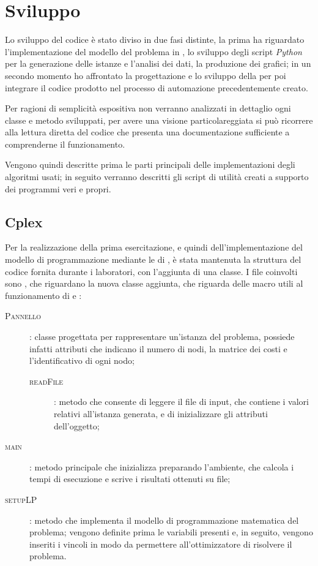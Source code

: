 \section{Sviluppo}
Lo sviluppo del codice è stato diviso in due fasi distinte, la prima ha riguardato l'implementazione del modello del problema in , lo sviluppo degli script \emph{Python} per la generazione delle istanze e l'analisi dei dati, la produzione dei grafici; in un secondo momento ho affrontato la progettazione e lo sviluppo della \tabu per poi integrare il codice prodotto nel processo di automazione precedentemente creato.

Per ragioni di semplicità espositiva non verranno analizzati in dettaglio ogni classe e metodo sviluppati, per avere una visione particolareggiata si può ricorrere alla lettura diretta del codice che presenta una documentazione sufficiente a comprenderne il funzionamento.

Vengono quindi descritte prima le parti principali delle implementazioni degli algoritmi usati; in seguito verranno descritti gli script di utilità creati a supporto dei programmi veri e propri.

\subsection{Cplex}
Per la realizzazione della prima esercitazione, e quindi dell'implementazione del modello di programmazione mediante le  di , è stata mantenuta la struttura del codice fornita durante i laboratori, con l'aggiunta di una classe.
I file coinvolti sono ,  che riguardano la nuova classe aggiunta,  che riguarda delle macro utili al funzionamento di  e :

\begin{description}
	\item[\textsc{Pannello}]: classe progettata per rappresentare un'istanza del problema, possiede infatti attributi che indicano il numero di nodi, la matrice dei costi e l'identificativo di ogni nodo;
	\begin{description}
		\item[\textsc{readFile}]: metodo che consente di leggere il file di input, che contiene i valori relativi all'istanza generata, e di inizializzare gli attributi dell'oggetto;
	\end{description}
	\item[\textsc{main}]: metodo principale che inizializza  preparando l'ambiente, che calcola i tempi di esecuzione e scrive i risultati ottenuti su file;
	\item[\textsc{setupLP}]: metodo che implementa il modello di programmazione matematica del problema; vengono definite prima le variabili presenti e, in seguito, vengono inseriti i vincoli in modo da permettere all'ottimizzatore di risolvere il problema.
\end{description}

